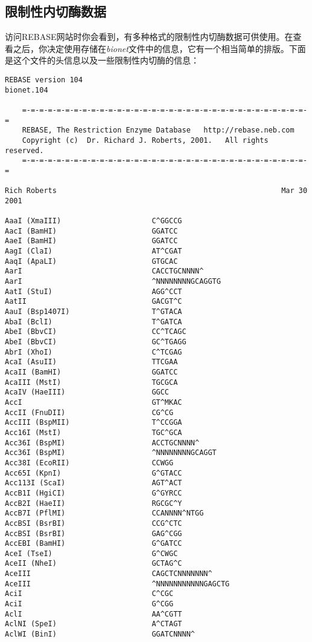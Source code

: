 \subsection{限制性内切酶数据}
访问REBASE网站时你会看到，有多种格式的限制性内切酶数据可供使用。在查看之后，你决定使用存储在\textit{bionet}文件中的信息，它有一个相当简单的排版。下面是这个文件的头信息以及一些限制性内切酶的信息：

\begin{lstlisting}
REBASE version 104                                              bionet.104
 
    =-=-=-=-=-=-=-=-=-=-=-=-=-=-=-=-=-=-=-=-=-=-=-=-=-=-=-=-=-=-=-=-=-=
    REBASE, The Restriction Enzyme Database   http://rebase.neb.com
    Copyright (c)  Dr. Richard J. Roberts, 2001.   All rights reserved.
    =-=-=-=-=-=-=-=-=-=-=-=-=-=-=-=-=-=-=-=-=-=-=-=-=-=-=-=-=-=-=-=-=-=
 
Rich Roberts                                                    Mar 30 2001
 
AaaI (XmaIII)                     C^GGCCG
AacI (BamHI)                      GGATCC
AaeI (BamHI)                      GGATCC
AagI (ClaI)                       AT^CGAT
AaqI (ApaLI)                      GTGCAC
AarI                              CACCTGCNNNN^
AarI                              ^NNNNNNNNGCAGGTG
AatI (StuI)                       AGG^CCT
AatII                             GACGT^C
AauI (Bsp1407I)                   T^GTACA
AbaI (BclI)                       T^GATCA
AbeI (BbvCI)                      CC^TCAGC
AbeI (BbvCI)                      GC^TGAGG
AbrI (XhoI)                       C^TCGAG
AcaI (AsuII)                      TTCGAA
AcaII (BamHI)                     GGATCC
AcaIII (MstI)                     TGCGCA
AcaIV (HaeIII)                    GGCC
AccI                              GT^MKAC
AccII (FnuDII)                    CG^CG
AccIII (BspMII)                   T^CCGGA
Acc16I (MstI)                     TGC^GCA
Acc36I (BspMI)                    ACCTGCNNNN^
Acc36I (BspMI)                    ^NNNNNNNNGCAGGT
Acc38I (EcoRII)                   CCWGG
Acc65I (KpnI)                     G^GTACC
Acc113I (ScaI)                    AGT^ACT
AccB1I (HgiCI)                    G^GYRCC
AccB2I (HaeII)                    RGCGC^Y
AccB7I (PflMI)                    CCANNNN^NTGG
AccBSI (BsrBI)                    CCG^CTC
AccBSI (BsrBI)                    GAG^CGG
AccEBI (BamHI)                    G^GATCC
AceI (TseI)                       G^CWGC
AceII (NheI)                      GCTAG^C
AceIII                            CAGCTCNNNNNNN^
AceIII                            ^NNNNNNNNNNNGAGCTG
AciI                              C^CGC
AciI                              G^CGG
AclI                              AA^CGTT
AclNI (SpeI)                      A^CTAGT
AclWI (BinI)                      GGATCNNNN^
\end{lstlisting}

